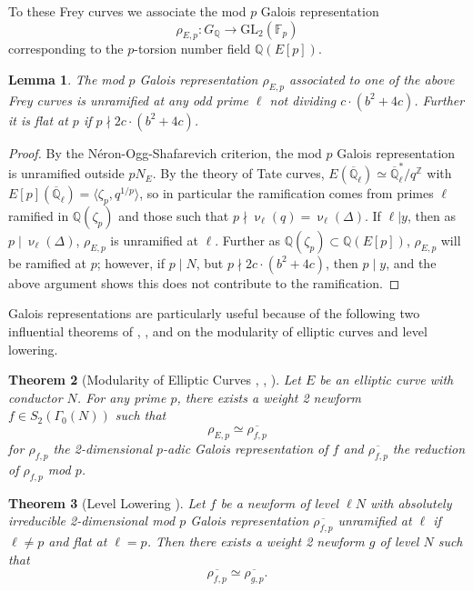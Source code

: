 \documentclass[12pt]{amsart}
\newtheorem{thm}{Theorem}[section]
\newtheorem{lem}[thm]{Lemma}
\theoremstyle{definition}
\def\F{{\mathbb F}}
\def\Q{{\mathbb Q}}
\def\Z{{\mathbb Z}}
\newcommand{\GL}{\text{GL}}
\renewcommand{\bar}{\overline}
\newcommand{\notdiv}{\nmid}
\begin{document}
To these Frey curves we associate the mod $p$ Galois representation
\[ \rho_{E,p}: G_{\Q} \rightarrow \GL_2(\F_p) \]
corresponding to the $p$-torsion number field $\Q(E[p])$.

\begin{lem}\label{unram}
The mod $p$ Galois representation $\rho_{E,p}$ associated to one of the above Frey curves is unramified at any odd prime $\ell$ not dividing $c \cdot (b^2+4c)$.  Further it is flat at $p$ if $p \notdiv 2c\cdot (b^2+4c)$.
\end{lem}
\begin{proof}
By the N\'{e}ron-Ogg-Shafarevich criterion, the mod $p$ Galois representation is unramified outside $pN_E$.  By the theory of Tate curves, $E(\bar{\Q}_\ell) \simeq \bar{\Q}_\ell^\ast / q^{\Z}$ with $E[p](\bar{\Q}_\ell) = \langle \zeta_p, q^{1/p} \rangle$, so in particular the ramification comes from primes $\ell$ ramified in $\Q(\zeta_p)$ and those such that $p \notdiv \upnu_\ell(q) = \upnu_\ell(\Delta)$.  If $\ell | y$, then as $p \mid \upnu_\ell(\Delta)$, $\rho_{E,p}$ is unramified at $\ell$.  Further as $\Q(\zeta_p) \subset \Q(E[p])$, $\rho_{E,p}$ will be ramified at $p$; however, if $p \mid N$, but $p \notdiv 2c \cdot (b^2+4c)$, then $p \mid y$, and the above argument shows this does not contribute to the ramification.
\end{proof}

Galois representations are particularly useful because of the following two influential theorems of \cite{wiles95}, \cite{taylorwiles95}, \cite{conrad01} and \cite{ribet91}  on the modularity of elliptic curves and level lowering.

\begin{thm}[Modularity of Elliptic Curves \cite{wiles95}, \cite{taylorwiles95}, \cite{conrad01}]\label{modularity}
Let $E$ be an elliptic curve with conductor $N$.  For any prime $p$, there exists a weight 2 newform $f \in S_2(\Gamma_0(N))$ such that
\[ \rho_{E,p} \simeq \bar{\rho_{f,p}} \]
for $\rho_{f,p}$ the 2-dimensional $p$-adic Galois representation of $f$ and $\bar{\rho_{f,p}}$ the reduction of $\rho_{f,p}$ mod $p$.
\end{thm}

\begin{thm}[Level Lowering \cite{ribet91}]\label{levellow}
Let $f$ be a newform of level $\ell N$ with absolutely irreducible 2-dimensional mod $p$ Galois representation $\bar{\rho_{f,p}}$ unramified at $\ell$ if $\ell \neq p$ and flat at $\ell = p$.  Then there exists a weight 2 newform $g$ of level $N$ such that
\[ \bar{\rho_{f,p}} \simeq \bar{\rho_{g,p}}. \]
\end{thm}
\end{document}
